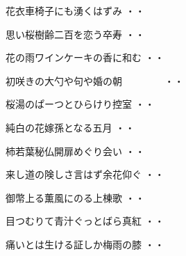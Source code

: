 \begin{shiika}花衣車椅子にも湧くはずみ
\hfill{・・}\end{shiika}
\vspace{0.6cm}
\begin{shiika}思い桜樹齢二百を恋う卒寿
\hfill{・・}\end{shiika}
\vspace{0.6cm}
\begin{shiika}花の雨ワインケーキの香に和む
\hfill{・・}\end{shiika}
\vspace{0.6cm}
\begin{shiika}初咲きの大勺や句や婚の朝　　　　
\hfill{・・}\end{shiika}
\vspace{0.6cm}
\begin{shiika}桜湯のぱーつとひらけり控室
\hfill{・・}\end{shiika}
\vspace{0.6cm}
\begin{shiika}純白の花嫁孫となる五月
\hfill{・・}\end{shiika}
\vspace{0.6cm}
\begin{shiika}柿若葉秘仏開扉めぐり会い
\hfill{・・}\end{shiika}
\vspace{0.6cm}
\begin{shiika}来し道の険しさ言はず余花仰ぐ
\hfill{・・}\end{shiika}
\vspace{0.6cm}
\begin{shiika}御幣上る薫風にのる上棟歌
\hfill{・・}\end{shiika}
\vspace{0.6cm}
\begin{shiika}目つむりて青汁ぐっとばら真紅
\hfill{・・}\end{shiika}
\vspace{0.6cm}
\begin{shiika}痛いとは生ける証しか梅雨の膝
\hfill{・・}\end{shiika}
\vspace{0.6cm}
